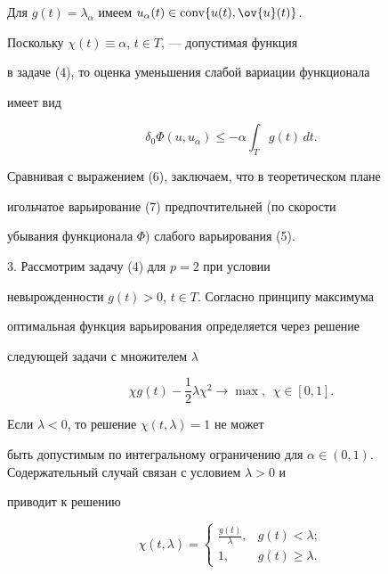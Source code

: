 Для $g(t) = \lambda_{\alpha}$ имеем $u_{\alpha}(t) \in \conv


\{u(t), \ov{u}(t)\}$.





Поскольку $\chi(t) \equiv \alpha$, $t \in T$, --- допустимая функция


в задаче (4), то оценка уменьшения слабой вариации функционала


имеет вид


\begin{equation}


\delta_{0} \Phi(u, u_{\alpha}) \leq - \alpha \int_{T} g(t)\,dt.


\end{equation}


Сравнивая с выражением (6), заключаем, что в теоретическом плане


игольчатое варьирование (7) предпочтительней (по скорости


убывания функционала $\Phi$) слабого варьирования (5).


\smallskip





3. Рассмотрим задачу (4) для $p = 2$ при условии


невырожденности $g(t) > 0$, $t \in T$. Согласно принципу максимума


оптимальная функция варьирования определяется через решение


следующей задачи с множителем $\lambda$


$$


\chi g(t) - \frac{1}{2} \lambda \chi^{2} \rightarrow \max,


\ \ \chi \in [0, 1].


$$


Если $\lambda < 0$, то решение $\chi(t, \lambda) = 1$ не может


быть допустимым по интегральному ограничению для $\alpha \in (0,


1)$. Содержательный случай связан с условием $\lambda > 0$ и


приводит к решению


\begin{equation}


\chi(t, \lambda) =


\begin{cases}


\frac{g(t)}{\lambda}, & g(t) < \lambda; \\


1, & g(t) \geq \lambda.


\end{cases}


\end{equation}


